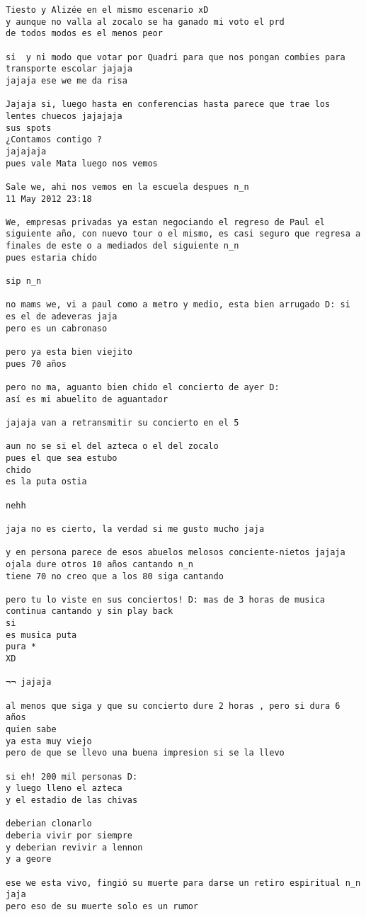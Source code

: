 \begin{verbatim}
Tiesto y Alizée en el mismo escenario xD
y aunque no valla al zocalo se ha ganado mi voto el prd
de todos modos es el menos peor

si  y ni modo que votar por Quadri para que nos pongan combies para transporte escolar jajaja
jajaja ese we me da risa

Jajaja si, luego hasta en conferencias hasta parece que trae los lentes chuecos jajajaja
sus spots
¿Contamos contigo ?
jajajaja
pues vale Mata luego nos vemos

Sale we, ahi nos vemos en la escuela despues n_n
11 May 2012 23:18

We, empresas privadas ya estan negociando el regreso de Paul el siguiente año, con nuevo tour o el mismo, es casi seguro que regresa a finales de este o a mediados del siguiente n_n
pues estaria chido

sip n_n

no mams we, vi a paul como a metro y medio, esta bien arrugado D: si es el de adeveras jaja
pero es un cabronaso

pero ya esta bien viejito
pues 70 años

pero no ma, aguanto bien chido el concierto de ayer D:
así es mi abuelito de aguantador

jajaja van a retransmitir su concierto en el 5

aun no se si el del azteca o el del zocalo
pues el que sea estubo
chido
es la puta ostia

nehh

jaja no es cierto, la verdad si me gusto mucho jaja

y en persona parece de esos abuelos melosos conciente-nietos jajaja ojala dure otros 10 años cantando n_n
tiene 70 no creo que a los 80 siga cantando

pero tu lo viste en sus conciertos! D: mas de 3 horas de musica continua cantando y sin play back
si
es musica puta
pura *
XD

¬¬ jajaja

al menos que siga y que su concierto dure 2 horas , pero si dura 6 años
quien sabe
ya esta muy viejo
pero de que se llevo una buena impresion si se la llevo

si eh! 200 mil personas D:
y luego lleno el azteca
y el estadio de las chivas

deberian clonarlo
deberia vivir por siempre
y deberian revivir a lennon
y a geore

ese we esta vivo, fingió su muerte para darse un retiro espiritual n_n jaja
pero eso de su muerte solo es un rumor


\end{verbatim}
